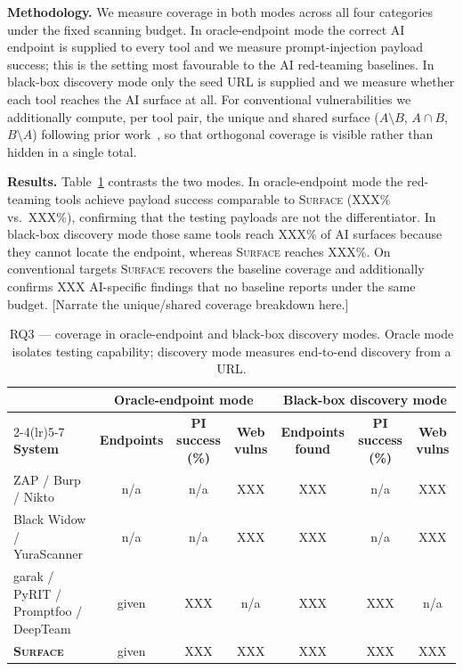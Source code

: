 \textbf{Methodology.} We measure coverage in both modes across all four
categories under the fixed scanning budget. In oracle-endpoint mode the correct
AI endpoint is supplied to every tool and we measure prompt-injection payload
success; this is the setting most favourable to the AI red-teaming baselines. In
black-box discovery mode only the seed URL is supplied and we measure whether
each tool reaches the AI surface at all. For conventional vulnerabilities we
additionally compute, per tool pair, the unique and shared surface
($A\setminus B$, $A\cap B$, $B\setminus A$) following prior
work~\cite{yurascanner,blackwidow}, so that orthogonal coverage is visible
rather than hidden in a single total.

\textbf{Results.} Table~\ref{tab:rq3} contrasts the two modes. In
oracle-endpoint mode the red-teaming tools achieve payload success comparable to
\textsc{Surface} (\textsc{XXX}\% vs.\ \textsc{XXX}\%), confirming that the
testing payloads are not the differentiator. In black-box discovery mode those
same tools reach \textsc{XXX}\% of AI surfaces because they cannot locate the
endpoint, whereas \textsc{Surface} reaches \textsc{XXX}\%. On conventional
targets \textsc{Surface} recovers the baseline coverage and additionally
confirms \textsc{XXX} AI-specific findings that no baseline reports under the
same budget. [Narrate the unique/shared coverage breakdown here.]

\begin{table}[t]
\centering
\caption{RQ3 --- coverage in oracle-endpoint and black-box discovery modes.
Oracle mode isolates testing capability; discovery mode measures
end-to-end discovery from a URL.}
\label{tab:rq3}
\small
\begin{tabular}{@{}lcccccc@{}}
\toprule
& \multicolumn{3}{c}{\textbf{Oracle-endpoint mode}}
& \multicolumn{3}{c}{\textbf{Black-box discovery mode}} \\
\cmidrule(lr){2-4}\cmidrule(lr){5-7}
\textbf{System} & \textbf{Endpoints} & \textbf{PI success (\%)} & \textbf{Web vulns}
                & \textbf{Endpoints found} & \textbf{PI success (\%)} & \textbf{Web vulns} \\
\midrule
ZAP / Burp / Nikto        & n/a         & n/a         & \textsc{XXX} & \textsc{XXX} & n/a         & \textsc{XXX} \\
Black Widow / YuraScanner & n/a         & n/a         & \textsc{XXX} & \textsc{XXX} & n/a         & \textsc{XXX} \\
garak / PyRIT / Promptfoo / DeepTeam & given & \textsc{XXX} & n/a & \textsc{XXX} & \textsc{XXX} & n/a \\
\textbf{\textsc{Surface}} & given       & \textsc{XXX} & \textsc{XXX} & \textsc{XXX} & \textsc{XXX} & \textsc{XXX} \\
\bottomrule
\end{tabular}
\end{table}

